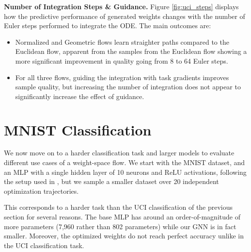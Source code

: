 \textbf{Number of Integration Steps \& Guidance.} Figure \ref{fig:uci_steps} displays how the predictive performance of generated weights changes with the number of Euler steps performed to integrate the ODE. The main outcomes are:
\begin{itemize}
    \item Normalized and Geometric flows learn straighter paths compared to the Euclidean flow, apparent from the samples from the Euclidean flow showing a more significant improvement in quality going from 8 to 64 Euler steps. 
    \item For all three flows, guiding the integration with task gradients improves sample quality, but increasing the number of integration does not appear to significantly increase the effect of guidance. 
\end{itemize}


\section{MNIST Classification} \label{sec:mnist_classification}

We now move on to a harder classification task and larger models to evaluate different use cases of a weight-space flow. We start with the MNIST dataset, and an MLP with a single hidden layer of 10 neurons and ReLU activations, following the setup used in \citep{peeblesLearningLearnGenerative2022}, but we sample a smaller dataset over 20 independent optimization trajectories.

This corresponds to a harder task than the UCI classification of the previous section for several reasons. The base MLP has around an order-of-magnitude of more parameters (7,960 rather than 802 parameters) while our GNN is in fact smaller. Moreover, the optimized weights do not reach perfect accuracy unlike in the UCI classification task. 

